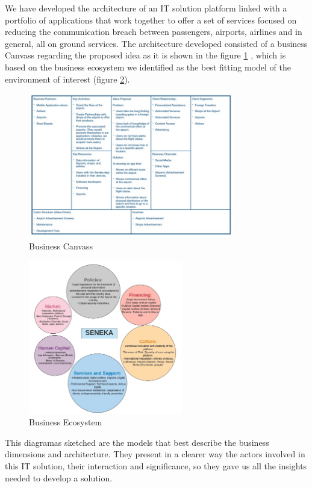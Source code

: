 \documentclass[12pt]{article}
\begin{document}
We have developed the architecture of an IT solution platform linked with a portfolio of applications that work together to offer a set of services focused on reducing the communication breach between passengers, airports, airlines and in general, all on ground services. The architecture developed consisted of a business Canvass regarding the proposed idea as it is shown in the figure \ref{canvass} , which is based on the business ecosystem we identified as the best fitting model of the environment of interest (figure \ref{ecosystem}).

\begin{figure}[H]
	\centering
	\includegraphics[width=0.8\textwidth]{Canvass.jpg}
	\caption { Business Canvass}
	\label{canvass}
\end{figure}

\begin{figure}[H]
	\centering
	\includegraphics[width=0.6\textwidth]{Ecosystem.jpeg}
	\caption { Business Ecosystem}
	\label{ecosystem}
\end{figure}

This diagramas sketched are the models that best describe the business dimensions and architecture. They present in a clearer way the actors involved in this IT solution, their interaction and significance, so they gave us all the insights needed to develop a solution. 
\end{document}

